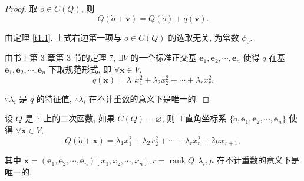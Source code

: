 \documentclass{ctexart}
\begin{document}
\begin{proof}
    取 $\dot{o}\in C(Q)$, 则
    \[Q(\dot{o}+\boldsymbol{v})=Q(\dot{o})+q(\boldsymbol{v}).\]

    由定理 \ref{t1.1}, 上式右边第一项与 $\dot{o}\in C(Q)$ 的选取无关, 为常数 $\phi_0$.

    由书上第 3 章第 3 节的定理 7, $\exists V$ 的一个标准正交基 $\boldsymbol{e}_1,\boldsymbol{e}_2,\cdots,\boldsymbol{e}_n$ 使得 $q$ 在基 $\boldsymbol{e}_1,\boldsymbol{e}_2,\cdots,\boldsymbol{e}_n$ 下取规范形式, 即 $\forall\boldsymbol{x}\in V$,
    \[q(\boldsymbol{x})=\lambda_1x^2_1+\lambda_2x^2_2+\cdots+\lambda_rx^2_r.\]

    $\because\lambda_i$ 是 $q$ 的特征值, $\therefore\lambda_i$ 在不计重数的意义下是唯一的.
\end{proof}
\begin{theorem}
    设 $Q$ 是 $\mathbb{E}$ 上的二次函数, 如果 $C(Q)=\varnothing$, 则 $\exists$ 直角坐标系 $\{\dot{o},\boldsymbol{e}_1,\boldsymbol{e}_2,\cdots,\boldsymbol{e}_n\}$ 使得 $\forall\boldsymbol{x}\in V$,
    \[Q(\dot{o}+\boldsymbol{x})=\lambda_1x^2_1+\lambda_2x^2_2+\cdots+\lambda_rx^2_r+2\mu x_{r+1},\]

    其中 $\boldsymbol{x}=(\boldsymbol{e}_1,\boldsymbol{e}_2,\cdots,\boldsymbol{e}_n)[x_1,x_2,\cdots,x_n],r=\operatorname{rank}Q,\lambda_i,\mu$ 在不计重数的意义下是唯一的.
\end{theorem}
\end{document}
